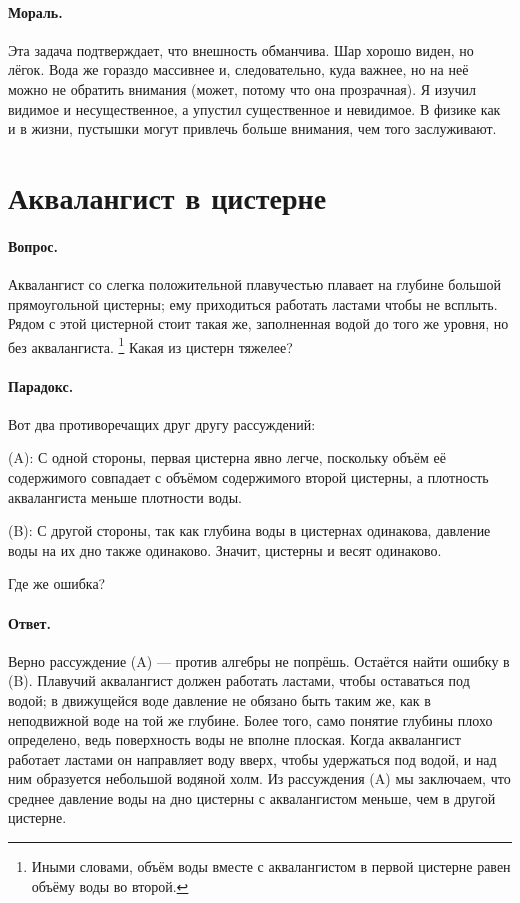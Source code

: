 \paragraph{Мораль.}
Эта задача подтверждает, что внешность обманчива.
Шар хорошо виден, но лёгок.
Вода же гораздо массивнее и, следовательно, куда важнее, но на неё можно не обратить внимания (может, потому что она прозрачная).
Я изучил видимое и несущественное, а упустил существенное и невидимое.
В физике как и в жизни, пустышки могут привлечь больше внимания, чем того заслуживают.

\section{Аквалангист в цистерне}

\paragraph{Вопрос.}
Аквалангист со слегка положительной плавучестью плавает на глубине большой прямоугольной цистерны; ему приходиться работать ластами чтобы не всплыть.
Рядом с этой цистерной стоит такая же, заполненная водой до того же уровня, но без аквалангиста.%
\footnote{Иными словами, объём воды вместе с аквалангистом в первой цистерне равен объёму воды во второй.}
Какая из цистерн тяжелее?

\paragraph{Парадокс.} Вот два противоречащих друг другу рассуждений:

(A): С одной стороны, первая цистерна явно легче, поскольку объём её содержимого совпадает с объёмом содержимого второй цистерны, а плотность аквалангиста меньше плотности воды.

(B): С другой стороны, так как глубина воды в цистернах одинакова, давление воды на их дно также одинаково.
Значит, цистерны и весят одинаково.

Где же ошибка?

\paragraph{Ответ.}
Верно рассуждение (A) --- против алгебры не попрёшь.
Остаётся найти ошибку в (B).
Плавучий аквалангист должен работать ластами, чтобы оставаться под водой;
в движущейся воде давление не обязано быть таким же, как в неподвижной воде на той же глубине.%
Более того, само понятие глубины плохо определено, ведь поверхность воды не вполне плоская.
Когда аквалангист работает ластами он направляет воду вверх, чтобы удержаться под водой,
и над ним образуется небольшой водяной холм.
Из рассуждения (A) мы заключаем, что среднее давление воды на дно цистерны с аквалангистом меньше, чем в другой цистерне.

